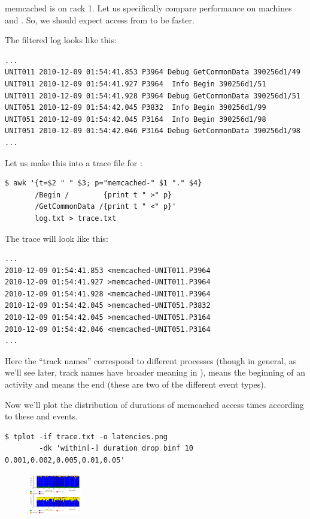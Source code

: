 \documentclass{article}
\begin{document}
memcached is on rack 1. Let us specifically compare performance on machines  and . So, we should expect access from  to be faster.

The filtered log looks like this:
\begin{verbatim}
...
UNIT011 2010-12-09 01:54:41.853 P3964 Debug GetCommonData 390256d1/49
UNIT011 2010-12-09 01:54:41.927 P3964  Info Begin 390256d1/51
UNIT011 2010-12-09 01:54:41.928 P3964 Debug GetCommonData 390256d1/51
UNIT051 2010-12-09 01:54:42.045 P3832  Info Begin 390256d1/99
UNIT051 2010-12-09 01:54:42.045 P3164  Info Begin 390256d1/98
UNIT051 2010-12-09 01:54:42.046 P3164 Debug GetCommonData 390256d1/98
...
\end{verbatim}

Let us make this into a trace file for \timeplot{}:
\begin{verbatim}
$ awk '{t=$2 " " $3; p="memcached-" $1 "." $4}
       /Begin /        {print t " >" p} 
       /GetCommonData /{print t " <" p}'
       log.txt > trace.txt
\end{verbatim}

The trace will look like this:
\begin{verbatim}
...
2010-12-09 01:54:41.853 <memcached-UNIT011.P3964
2010-12-09 01:54:41.927 >memcached-UNIT011.P3964
2010-12-09 01:54:41.928 <memcached-UNIT011.P3964
2010-12-09 01:54:42.045 >memcached-UNIT051.P3832
2010-12-09 01:54:42.045 >memcached-UNIT051.P3164
2010-12-09 01:54:42.046 <memcached-UNIT051.P3164
...
\end{verbatim}

Here the ``track names'' correspond to different processes (though in general, as we'll see later, track names have broader meaning in \timeplot{}), \hlverb{>} means the beginning of an activity and \hlverb{<} means the end (these are two of the different event types).

Now we'll plot the distribution of durations of memcached access times according to these \hlverb{>} and \hlverb{<} events.

\begin{verbatim}
$ tplot -if trace.txt -o latencies.png
        -dk 'within[-] duration drop binf 10 0.001,0.002,0.005,0.01,0.05'
\end{verbatim}

\begin{figure}
\vspace{-25pt}
\center
\includegraphics[height=50pt]{pics/tplot/tplot-motivating-example.png}
\end{figure}
\end{document}
